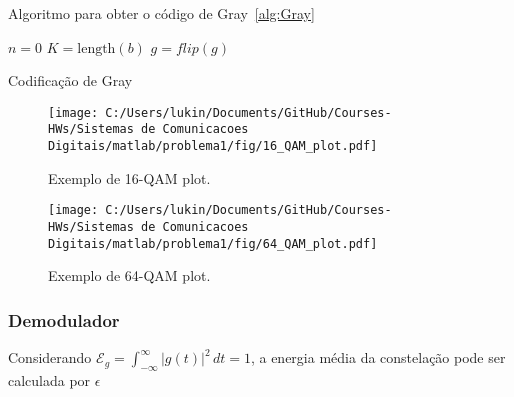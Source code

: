 Algoritmo para obter o código de Gray~\ref{alg:Gray}


\begin{algorithm}[!ht]
    \SetAlgoLined
    $n = 0$\;
    $K = \text{length}(b)$\;
     $g = flip(g)$\;
     \caption{Codificação de Gray}
     \label{alg:Gray}
\end{algorithm}

\clearpage



\begin{figure}[!ht]
    \centering
    \texttt{[image: C:/Users/lukin/Documents/GitHub/Courses-HWs/Sistemas de Comunicacoes Digitais/matlab/problema1/fig/16\_QAM\_plot.pdf]}
    \caption{Exemplo de 16-QAM plot.}
    \label{fig:16_QAM_plot}
\end{figure}

\begin{figure}[!ht]
    \centering
    \texttt{[image: C:/Users/lukin/Documents/GitHub/Courses-HWs/Sistemas de Comunicacoes Digitais/matlab/problema1/fig/64\_QAM\_plot.pdf]}
    \caption{Exemplo de 64-QAM plot.}
    \label{fig:64_QAM_plot}
\end{figure}

\clearpage

\subsubsection{Demodulador}

Considerando $\mathcal{E}_g = \int_{-\infty}^{\infty} |g(t)|^2 \,dt = 1$, a energia média da constelação pode ser calculada por $\epsilon$



